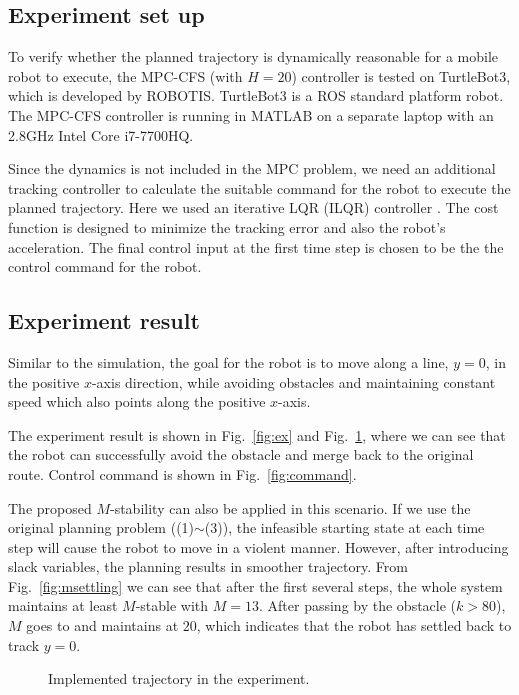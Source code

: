 \documentclass[letterpaper, 10 pt, conference]{ieeeconf}  %
\begin{document}
\subsection{Experiment set up}
To verify whether the planned trajectory is dynamically reasonable for a mobile robot to execute, the MPC-CFS (with $H=20$) controller is tested on TurtleBot3, which is  developed by ROBOTIS. TurtleBot3 is a ROS standard platform robot. The MPC-CFS controller is running in MATLAB on a separate laptop with an 2.8GHz Intel Core i7-7700HQ.

Since the dynamics is not included in the MPC problem, we need an additional tracking controller to calculate the suitable command for the robot to execute the planned trajectory. Here we used an iterative LQR (ILQR) controller \cite{tassa2012synthesis}. The cost function is designed to minimize the tracking error and also the robot's acceleration. The final control input at the first time step is chosen to be the the control command for the robot.

\subsection{Experiment result}
Similar to the simulation, the goal for the robot is to move along a line, $y=0$, in the positive $x$-axis direction, while avoiding obstacles and maintaining constant speed which also points along the positive $x$-axis.

The experiment result is shown in Fig.~\ref{fig:ex} and Fig.~\ref{fig:trajectory}, where we can see that the robot can successfully avoid the obstacle and merge back to the original route. Control command is shown in Fig.~\ref{fig:command}.

The proposed $M$-stability can also be applied in this scenario. If we use the original planning problem ((1)$\sim$(3)), the infeasible starting state at each time step will cause the robot to move in a violent manner. However, after introducing slack variables, the planning results in smoother trajectory. From Fig.~\ref{fig:msettling} we can see that after the first several steps, the whole system maintains at least $M$-stable with $M=13$. After passing by the obstacle ($k>80$), $M$ goes to and maintains at $20$, which indicates that the robot has settled back to track $y=0$. 


\begin{figure}[t]
      \centering
       
      \caption{ Implemented trajectory in the experiment. }
      \label{fig:trajectory}
\end{figure}
\end{document}
